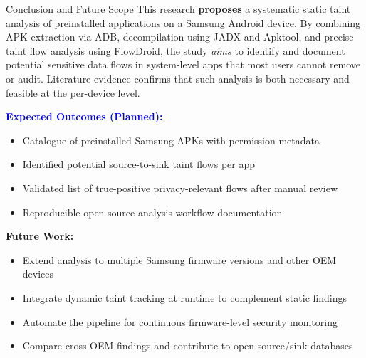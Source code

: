 \documentclass[aspectratio=169]{beamer}
\begin{document}
\begin{frame}{Conclusion and Future Scope}
\small
This research \textbf{proposes} a systematic static taint analysis of preinstalled
applications on a Samsung Android device. By combining APK extraction via ADB,
decompilation using JADX and Apktool, and precise taint flow analysis using FlowDroid,
the study \textit{aims} to identify and document potential sensitive data flows in
system-level apps that most users cannot remove or audit. Literature evidence confirms
that such analysis is both necessary and feasible at the per-device level.

\vspace{6pt}
\textbf{\textcolor{blue}{Expected Outcomes (Planned):}}
\begin{itemize}
    \item Catalogue of preinstalled Samsung APKs with permission metadata
    \item Identified potential source-to-sink taint flows per app
    \item Validated list of true-positive privacy-relevant flows after manual review
    \item Reproducible open-source analysis workflow documentation
\end{itemize}

\vspace{4pt}
\textbf{Future Work:}
\begin{itemize}
    \item Extend analysis to multiple Samsung firmware versions and other OEM devices
    \item Integrate dynamic taint tracking at runtime to complement static findings
    \item Automate the pipeline for continuous firmware-level security monitoring
    \item Compare cross-OEM findings and contribute to open source/sink databases
\end{itemize}
\end{frame}
\end{document}
